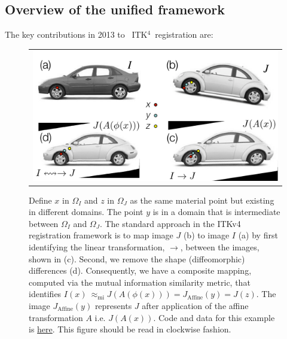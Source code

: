 \documentclass{frontiersSCNS}
\newcommand{\tk}{~ITK$^{\text{4}}$~}
\begin{document}
\subsection{Overview of the unified framework}
The key contributions in 2013 to \tk registration are:
\begin{figure}[t]
\begin{center}
\begin{tabular}{c}
\includegraphics[width=5in]{figs/RegistrationNomenclature.pdf}
\end{tabular}
\caption{\baselineskip 12pt \small Define $x$ in $\Omega_I$ and $z$ in
  $\Omega_J$ as the same material point but existing in different
  domains.  The point $y$ is in a domain that is intermediate between
  $\Omega_I$ and $\Omega_J$.  The standard approach in the ITKv4
  registration framework is to map image $J$ (b) to image $I$ (a) by first
  identifying the linear transformation, $\rightarrow$, between the images, shown in (c).  Second, we remove the shape (diffeomorphic)
  differences (d).  Consequently, we have a composite mapping, computed via the
  mutual information similarity metric, that identifies
  $I(x) ~\approx_\text{mi}  J(A(\phi(x))) =  J_\text{Affine}(y) = J(z)
  $. The image $J_\text{Affine}(y)$
  represents $J$ after application of the affine transformation $A$
  i.e. $J(A(x))$.  Code and data for this example is
  \href{http://stnava.github.io/cars/}{here}.  This figure should be
  read in clockwise fashion.}
\label{fig:composite}
\end{center}
\end{figure}
\end{document}
